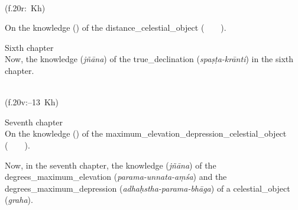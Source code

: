 \begin{multicols}{2}\label{discourse_part_6_chapter_title_example}
\noindent\reversemarginpar{}%
\columnbreak

\noindent\normalmarginpar{}%
\\
(f.\thinspace 20r:~Kh)
\end{multicols}%
%
\begin{multicols}{2}
On the \gls{knowledge} (\marifat) of the \gls{distance_celestial_object} (\bud\idafaconsonant\ \kawakib\ \az\ \muaddil\ \alnahar).
\columnbreak

Sixth chapter\\
Now, the \gls{knowledge} (\textit{jñāna}) of the \gls{true_declination} (\textit{spaṣṭa-krānti}) in the sixth chapter.
\end{multicols}
\medskip

\begin{multicols}{2}
\noindent\reversemarginpar{}%
\columnbreak

\noindent\normalmarginpar{}%
\\
(f.\thinspace 20v:--13~Kh)
\end{multicols}%
%
\begin{multicols}{2}
Seventh chapter\\
On the \gls{knowledge} (\marifat) of the \gls{maximum_elevation_depression_celestial_object} (\ghayat\idafaconsonant\ \irtifa\ \va\ \inkhifad\idafaconsonant\ \kawakib).
\columnbreak

Now, in the seventh chapter, the \gls{knowledge} (\textit{jñāna}) of the \gls{degrees_maximum_elevation} (\textit{parama-unnata-aṃśa}) and the \gls{degrees_maximum_depression} (\textit{adhaḥstha-parama-bhāga}) of a \gls{celestial_object} (\textit{graha}).
\end{multicols}

\newpage %

